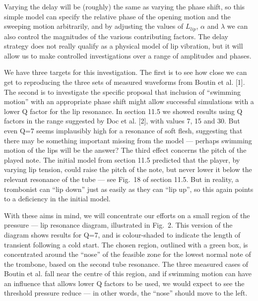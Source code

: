   Varying the delay will be (roughly) the same as varying the phase shift, so 
  this simple model can specify the relative phase of the opening motion and 
  the sweeping motion arbitrarily, and by adjusting the values of $L_{lip}$, 
  $\alpha$ and $\lambda$ we can also control the magnitudes of the various 
  contributing factors. The delay strategy does not really qualify as a 
  physical model of lip vibration, but it will allow us to make controlled 
  investigations over a range of amplitudes and phases. 

  We have three targets for this investigation. The first is to see how close 
  we can get to reproducing the three sets of measured waveforms from Boutin et 
  al. [1]. The second is to investigate the specific proposal that inclusion of 
  ``swimming motion'' with an appropriate phase shift might allow successful 
  simulations with a lower Q factor for the lip resonance. In section 11.5 we 
  showed results using Q factors in the range suggested by Doc et al. [2], with 
  values 7, 15 and 30. But even Q=7 seems implausibly high for a resonance of 
  soft flesh, suggesting that there may be something important missing from the 
  model --- perhaps swimming motion of the lips will be the answer? The third 
  effect concerns the pitch of the played note. The initial model from section 
  11.5 predicted that the player, by varying lip tension, could raise the pitch 
  of the note, but never lower it below the relevant resonance of the tube --- 
  see Fig.\ 18 of section 11.5. But in reality, a trombonist can ``lip down'' 
  just as easily as they can ``lip up'', so this again points to a deficiency 
  in the initial model. 

  With these aims in mind, we will concentrate our efforts on a small region of 
  the pressure --- lip resonance diagram, illustrated in Fig.\ 2. This version 
  of the diagram shows results for Q=7, and is colour-shaded to indicate the 
  length of transient following a cold start. The chosen region, outlined with 
  a green box, is concentrated around the ``nose'' of the feasible zone for the 
  lowest normal note of the trombone, based on the second tube resonance. The 
  three measured cases of Boutin et al. fall near the centre of this region, 
  and if swimming motion can have an influence that allows lower Q factors to 
  be used, we would expect to see the threshold pressure reduce — in other 
  words, the ``nose'' should move to the left. 


